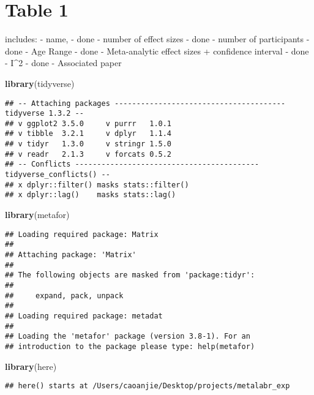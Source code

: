 \documentclass[
]{article}
\author{}
\date{\vspace{-2.5em}}
\newenvironment{Shaded}{\begin{snugshade}}{\end{snugshade}}
\newcommand{\FunctionTok}[1]{\textcolor[rgb]{0.13,0.29,0.53}{\textbf{#1}}}
\newcommand{\NormalTok}[1]{#1}
\begin{document}
\hypertarget{table-1}{%
\section{Table 1}\label{table-1}}

includes: - name, - done - number of effect sizes - done - number of
participants - done - Age Range - done - Meta-analytic effect sizes +
confidence interval - done - I\^{}2 - done - Associated paper

\begin{Shaded}
\begin{Highlighting}[]
\FunctionTok{library}\NormalTok{(tidyverse)}
\end{Highlighting}
\end{Shaded}

\begin{verbatim}
## -- Attaching packages --------------------------------------- tidyverse 1.3.2 --
## v ggplot2 3.5.0     v purrr   1.0.1
## v tibble  3.2.1     v dplyr   1.1.4
## v tidyr   1.3.0     v stringr 1.5.0
## v readr   2.1.3     v forcats 0.5.2
## -- Conflicts ------------------------------------------ tidyverse_conflicts() --
## x dplyr::filter() masks stats::filter()
## x dplyr::lag()    masks stats::lag()
\end{verbatim}

\begin{Shaded}
\begin{Highlighting}[]
\FunctionTok{library}\NormalTok{(metafor)}
\end{Highlighting}
\end{Shaded}

\begin{verbatim}
## Loading required package: Matrix
## 
## Attaching package: 'Matrix'
## 
## The following objects are masked from 'package:tidyr':
## 
##     expand, pack, unpack
## 
## Loading required package: metadat
## 
## Loading the 'metafor' package (version 3.8-1). For an
## introduction to the package please type: help(metafor)
\end{verbatim}

\begin{Shaded}
\begin{Highlighting}[]
\FunctionTok{library}\NormalTok{(here)}
\end{Highlighting}
\end{Shaded}

\begin{verbatim}
## here() starts at /Users/caoanjie/Desktop/projects/metalabr_exp
\end{verbatim}
\end{document}
